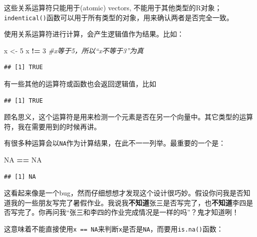 \documentclass[]{book}
\newenvironment{Shaded}{\begin{snugshade}}{\end{snugshade}}
\newcommand{\CommentTok}[1]{\textcolor[rgb]{0.56,0.35,0.01}{\textit{#1}}}
\newcommand{\DecValTok}[1]{\textcolor[rgb]{0.00,0.00,0.81}{#1}}
\newcommand{\KeywordTok}[1]{\textcolor[rgb]{0.13,0.29,0.53}{\textbf{#1}}}
\newcommand{\NormalTok}[1]{#1}
\newcommand{\OperatorTok}[1]{\textcolor[rgb]{0.81,0.36,0.00}{\textbf{#1}}}
\newcommand{\OtherTok}[1]{\textcolor[rgb]{0.56,0.35,0.01}{#1}}
\newcommand{\StringTok}[1]{\textcolor[rgb]{0.31,0.60,0.02}{#1}}
\begin{document}
这些关系运算符只能用于(atomic) vectors, 不能用于其他类型的R对象；\texttt{indentical()}函数可以用于所有类型的对象，用来确认两者是否完全一致。

使用关系运算符进行计算，会产生逻辑值作为结果。比如：

\begin{Shaded}
\begin{Highlighting}[]
\NormalTok{x <-}\StringTok{ }\DecValTok{5}
\NormalTok{x }\OperatorTok{!=}\StringTok{ }\DecValTok{3} \CommentTok{#x等于5，所以“x不等于3”为真}
\end{Highlighting}
\end{Shaded}

\begin{verbatim}
## [1] TRUE
\end{verbatim}

有一些其他的运算符或函数也会返回逻辑值，比如

\begin{Shaded}
\end{Shaded}

\begin{verbatim}
## [1] TRUE
\end{verbatim}

顾名思义，这个运算符是用来检测一个元素是否在另一个向量中。其它类型的运算符，我在需要用到的时候再讲。

有很多种运算会以\texttt{NA}作为计算结果，在此不一一列举。最重要的一个是：

\begin{Shaded}
\begin{Highlighting}[]
\OtherTok{NA} \OperatorTok{==}\StringTok{ }\OtherTok{NA}
\end{Highlighting}
\end{Shaded}

\begin{verbatim}
## [1] NA
\end{verbatim}

这看起来像是一个bug，然而仔细想想才发现这个设计很巧妙。假设你问我是否知道我的一些朋友写完了暑假作业。我说我\textbf{不知道}张三是否写完了，也\textbf{不知道}李四是否写完了。你再问我``张三和李四的作业完成情况是一样的吗''？鬼才知道咧！

这意味着不能直接使用\texttt{x\ ==\ NA}来判断\texttt{x}是否是\texttt{NA}，而要用\texttt{is.na()}函数：
\end{document}
